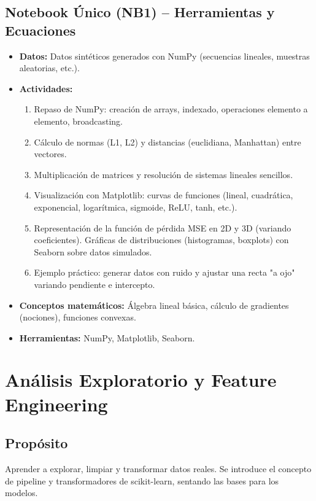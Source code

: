 \documentclass[12pt,a4paper]{article}
\begin{document}
\subsection*{Notebook Único (NB1) – Herramientas y Ecuaciones}
\begin{itemize}
    \item \textbf{Datos:} Datos sintéticos generados con NumPy (secuencias lineales, muestras aleatorias, etc.).
    \item \textbf{Actividades:}
    \begin{enumerate}
        \item Repaso de NumPy: creación de arrays, indexado, operaciones elemento a elemento, broadcasting.
        \item Cálculo de normas (L1, L2) y distancias (euclidiana, Manhattan) entre vectores.
        \item Multiplicación de matrices y resolución de sistemas lineales sencillos.
        \item Visualización con Matplotlib: curvas de funciones (lineal, cuadrática, exponencial, logarítmica, sigmoide, ReLU, tanh, etc.).
        \item Representación de la función de pérdida MSE en 2D y 3D (variando coeficientes).
        \briefitem Gráficas de distribuciones (histogramas, boxplots) con Seaborn sobre datos simulados.
        \item Ejemplo práctico: generar datos con ruido y ajustar una recta "a ojo" variando pendiente e intercepto.
    \end{enumerate}
    \item \textbf{Conceptos matemáticos:} Álgebra lineal básica, cálculo de gradientes (nociones), funciones convexas.
    \item \textbf{Herramientas:} NumPy, Matplotlib, Seaborn.
\end{itemize}

\section{Análisis Exploratorio y Feature Engineering}
\subsection*{Propósito}
Aprender a explorar, limpiar y transformar datos reales. Se introduce el concepto de pipeline y transformadores de scikit-learn, sentando las bases para los modelos.
\end{document}
